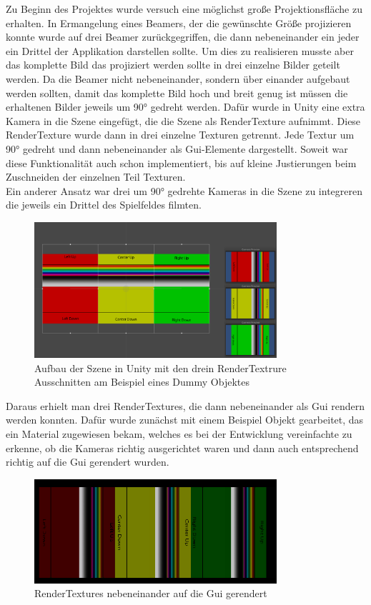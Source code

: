
Zu Beginn des Projektes wurde versuch eine möglichst große Projektionsfläche zu erhalten. In Ermangelung eines Beamers, der die gewünschte Größe projizieren konnte wurde auf drei Beamer zurückgegriffen, die dann nebeneinander ein jeder ein Drittel der Applikation darstellen sollte. Um dies zu realisieren musste aber das komplette Bild das projiziert werden sollte in drei einzelne Bilder geteilt werden. Da die Beamer nicht nebeneinander, sondern über einander aufgebaut werden sollten, damit das komplette Bild hoch und breit genug ist müssen die erhaltenen Bilder jeweils um 90° gedreht werden. Dafür wurde in Unity eine extra Kamera in die Szene eingefügt, die die Szene als RenderTexture aufnimmt. Diese RenderTexture wurde dann in drei einzelne Texturen getrennt. Jede Textur um 90° gedreht und dann nebeneinander als Gui-Elemente dargestellt. Soweit war diese Funktionalität auch schon implementiert, bis auf kleine Justierungen beim Zuschneiden der einzelnen Teil Texturen. \\
Ein anderer Ansatz war drei um 90° gedrehte Kameras in die Szene zu integreren die jeweils ein Drittel des Spielfeldes filmten. 
\begin{figure}[h]
	\centering
		\includegraphics[width=0.8\textwidth]{images/RenderTextureBeispielSzene.PNG}
	\caption{Aufbau der Szene in Unity mit den drein RenderTextrure Ausschnitten am Beispiel eines Dummy Objektes}
	\label{fig:RenderTextureBeispielSzene}
\end{figure}
Daraus erhielt man drei RenderTextures, die dann nebeneinander als Gui rendern werden konnten. Dafür wurde zunächst mit einem Beispiel Objekt gearbeitet, das ein Material zugewiesen bekam, welches es bei der Entwicklung vereinfachte zu erkenne, ob die Kameras richtig ausgerichtet waren und dann auch entsprechend richtig auf die Gui gerendert wurden. 
\begin{figure}[h]
	\centering
		\includegraphics[width=0.8\textwidth]{images/RenderTexturesAlsGui.PNG}
	\caption{RenderTextures nebeneinander auf die Gui gerendert}
	\label{fig:RenderTexturesAlsGui}
\end{figure}\\
